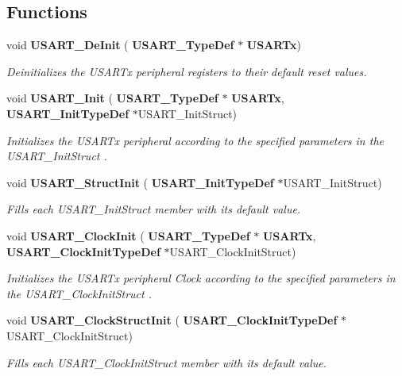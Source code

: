 \subsection*{Functions}
\begin{DoxyCompactItemize}
\item 
void \textbf{ U\+S\+A\+R\+T\+\_\+\+De\+Init} (\textbf{ U\+S\+A\+R\+T\+\_\+\+Type\+Def} $\ast$\textbf{ U\+S\+A\+R\+Tx})
\begin{DoxyCompactList}\small\item\em Deinitializes the U\+S\+A\+R\+Tx peripheral registers to their default reset values. \end{DoxyCompactList}\item 
void \textbf{ U\+S\+A\+R\+T\+\_\+\+Init} (\textbf{ U\+S\+A\+R\+T\+\_\+\+Type\+Def} $\ast$\textbf{ U\+S\+A\+R\+Tx}, \textbf{ U\+S\+A\+R\+T\+\_\+\+Init\+Type\+Def} $\ast$U\+S\+A\+R\+T\+\_\+\+Init\+Struct)
\begin{DoxyCompactList}\small\item\em Initializes the U\+S\+A\+R\+Tx peripheral according to the specified parameters in the U\+S\+A\+R\+T\+\_\+\+Init\+Struct . \end{DoxyCompactList}\item 
void \textbf{ U\+S\+A\+R\+T\+\_\+\+Struct\+Init} (\textbf{ U\+S\+A\+R\+T\+\_\+\+Init\+Type\+Def} $\ast$U\+S\+A\+R\+T\+\_\+\+Init\+Struct)
\begin{DoxyCompactList}\small\item\em Fills each U\+S\+A\+R\+T\+\_\+\+Init\+Struct member with its default value. \end{DoxyCompactList}\item 
void \textbf{ U\+S\+A\+R\+T\+\_\+\+Clock\+Init} (\textbf{ U\+S\+A\+R\+T\+\_\+\+Type\+Def} $\ast$\textbf{ U\+S\+A\+R\+Tx}, \textbf{ U\+S\+A\+R\+T\+\_\+\+Clock\+Init\+Type\+Def} $\ast$U\+S\+A\+R\+T\+\_\+\+Clock\+Init\+Struct)
\begin{DoxyCompactList}\small\item\em Initializes the U\+S\+A\+R\+Tx peripheral Clock according to the specified parameters in the U\+S\+A\+R\+T\+\_\+\+Clock\+Init\+Struct . \end{DoxyCompactList}\item 
void \textbf{ U\+S\+A\+R\+T\+\_\+\+Clock\+Struct\+Init} (\textbf{ U\+S\+A\+R\+T\+\_\+\+Clock\+Init\+Type\+Def} $\ast$U\+S\+A\+R\+T\+\_\+\+Clock\+Init\+Struct)
\begin{DoxyCompactList}\small\item\em Fills each U\+S\+A\+R\+T\+\_\+\+Clock\+Init\+Struct member with its default value. \end{DoxyCompactList}\item 

\end{DoxyCompactItemize}
